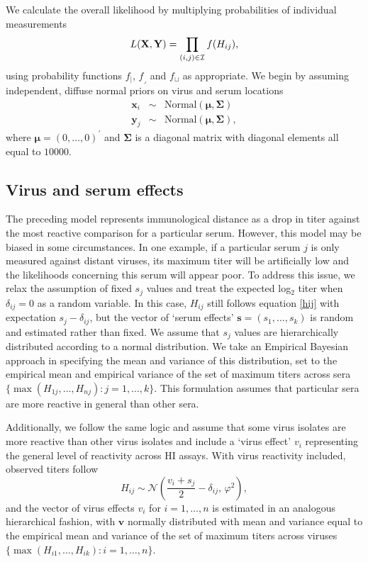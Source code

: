 \documentclass[11pt,oneside,letterpaper]{article}
\newcommand{\virus}{\mathbf{x}}						%
\newcommand{\serum}{\mathbf{y}}						%
\newcommand{\viruses}{\mathbf{X}}					%
\newcommand{\sera}{\mathbf{Y}}						%
\newcommand{\ve}{v}									%
\newcommand{\se}{s}									%
\newcommand{\ves}{\mathbf{v}}						%
\newcommand{\ses}{\mathbf{s}}						%
\newcommand{\point}{f_{\scriptscriptstyle \vert}}	%
\newcommand{\threshold}{f_{\textstyle \lrcorner}}	%
\newcommand{\interval}{f_{\sqcup}}					%
\newcommand{\mdssd}{\varphi}						%
\newcommand{\vn}{n}									%
\newcommand{\sn}{k}									%
\newcommand{\normal}{\mathcal{N}}					%
\begin{document}
We calculate the overall likelihood by multiplying probabilities of individual measurements
\begin{equation} 
	L(\viruses,\sera) = \prod_{(i,j) \in \cal I} f(H_{ij}),
\end{equation}
using probability functions $\point$, $\threshold$ and $\interval$ as appropriate.
We begin by assuming independent, diffuse normal priors on virus and serum locations
\begin{eqnarray}
	\virus_i &\sim& \mathrm{Normal}(\boldsymbol{\mu},\boldsymbol{\Sigma}) \nonumber \\
	\serum_j &\sim& \mathrm{Normal}(\boldsymbol{\mu},\boldsymbol{\Sigma}),
\end{eqnarray}
where $\boldsymbol{\mu} = (0,\ldots,0)^{\prime}$ and $\boldsymbol{\Sigma}$ is a diagonal matrix with diagonal elements all equal to $10000$.

\subsection*{Virus and serum effects}

The preceding model represents immunological distance as a drop in titer against the most reactive comparison for a particular serum.
However, this model may be biased in some circumstances.
In one example, if a particular serum $j$ is only measured against distant viruses, its maximum titer will be artificially low and the likelihoods concerning this serum will appear poor. 
To address this issue, we relax the assumption of fixed $\se_j$ values and treat the expected log$_2$ titer when $\delta_{ij}=0$ as a random variable.
In this case, $H_{ij}$ still follows equation \ref{hij} with expectation $\se_j - \delta_{ij}$, but the vector of `serum effects' $\ses = (\se_1,\ldots,\se_{\sn})$ is random and estimated rather than fixed.
We assume that $\se_j$ values are hierarchically distributed according to a normal distribution.   
We take an Empirical Bayesian approach in specifying the mean and variance of this distribution, set to the empirical mean and empirical variance of the set of maximum titers across sera $\{ \max ( H_{1j},\ldots,H_{\vn j} ) : j = 1,\ldots,\sn \}$.
This formulation assumes that particular sera are more reactive in general than other sera.

Additionally, we follow the same logic and assume that some virus isolates are more reactive than other virus isolates and include a `virus effect' $\ve_i$ representing the general level of reactivity across HI assays. 
With virus reactivity included, observed titers follow
\begin{equation}
	H_{ij} \sim \normal \left( \frac{\ve_i+\se_j}{2} - \delta_{ij}, \, \mdssd^2 \right),
\end{equation}
and the vector of virus effects $\ve_i$ for $i = 1,\ldots, \vn$ is estimated in an analogous hierarchical fashion, with $\ves$ normally distributed with mean and variance equal to the empirical mean and variance of the set of maximum titers across viruses $\{ \max ( H_{i1},\ldots,H_{i \sn} ) : i = 1,\ldots,\vn \}$.
\end{document}
